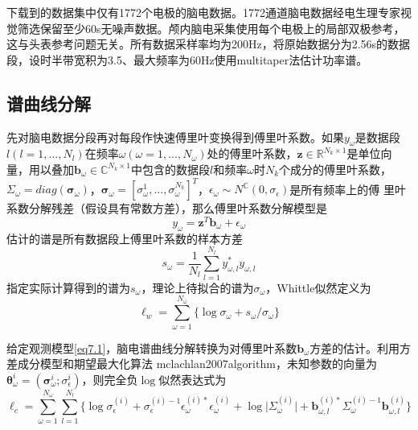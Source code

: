 下载到的数据集中仅有1772个电极的脑电数据。1772通道脑电数据经电生理专家视觉筛选保留至少60s无噪声数据。颅内脑电采集使用每个电极上的局部双极参考，这与头表参考问题无关。所有数据采样率均为200Hz，将原始数据分为2.56s的数据段，设时半带宽积为3.5、最大频率为60Hz使用multitaper法估计功率谱。

\subsection{谱曲线分解}
先对脑电数据分段再对每段作快速傅里叶变换得到傅里叶系数。如果$y_\omega$是数据段$l(l=1,...,N_l)$在频率$\omega(\omega=1,...,N_\omega)$处的傅里叶系数，$\mathbf{z}\in{\mathbb{R}^{N_k\times{1}}}$是单位向量，用以叠加$\mathbf{b}_\omega\in{\mathbb{C}^{N_k\times{1}}}$中包含的数据段$l$和频率$\omega$时$N_k$个成分的傅里叶系数，$\Sigma_\omega=diag(\mathbf{\sigma}_\omega)$，$\mathbf{\sigma}_\omega=[\sigma_\omega^1,...,\sigma_\omega^{N_k}]^T$，$\epsilon_\omega\sim{N^\mathbb{C}(0,\sigma_\epsilon)}$是所有频率上的傅
里叶系数分解残差（假设具有常数方差），那么傅里叶系数分解模型是
\begin{equation}\label{eq7.1}
y_\omega=\mathbf{z}^T\mathbf{b}_\omega+\epsilon_\omega
\end{equation}
估计的谱是所有数据段上傅里叶系数的样本方差
\begin{equation}\label{eq7.2}
s_\omega=\frac{1}{N_l}\sum_{l=1}^{N_l}y_{\omega,l}^*y_{\omega,l}
\end{equation}
指定实际计算得到的谱为$s_\omega$，理论上待拟合的谱为$\sigma_\omega$，Whittle似然定义为
\begin{equation}\label{eq7.3}
\ell_w=\sum_{\omega=1}^{N_\omega}\lbrace\log{\sigma_\omega}+s_\omega/\sigma_\omega\rbrace
\end{equation}

给定观测模型\eqref{eq7.1}，脑电谱曲线分解转换为对傅里叶系数$\mathbf{b}_\omega$方差的估计。利用方差成分模型和期望最大化算法\citing
{mclachlan2007algorithm}，未知参数的向量为$\mathbf{\theta}_\omega^{i}=(\mathbf{\sigma}_\omega^{i};\sigma_\epsilon^{i})$，则完全负$\log$似然表达式为
\begin{equation}\label{eq7.4}
\ell_c=\sum_{\omega=1}^{N_\omega}\sum_{l=1}^{N_l}\lbrace\log{\sigma}_\epsilon^{(i)}+\sigma_\epsilon^{(i)-1}\epsilon_\omega^{(i)*}\epsilon_\omega^{(i)}+\log\lvert\Sigma_\omega^{(i)}\rvert+\mathbf{b}_{\omega,l}^{(i)*}\Sigma_\omega^{(i)-1}\mathbf{b}_{\omega,l}^{(i)}\rbrace
\end{equation}

